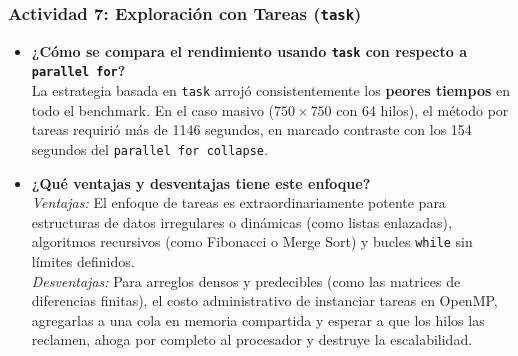 \subsubsection*{Actividad 7: Exploración con Tareas (\texttt{task})}
\begin{itemize}
    \item \textbf{¿Cómo se compara el rendimiento usando \texttt{task} con respecto a \texttt{parallel for}?} \\
    La estrategia basada en \texttt{task} arrojó consistentemente los \textbf{peores tiempos} en todo el benchmark. En el caso masivo ($750 \times 750$ con 64 hilos), el método por tareas requirió más de 1146 segundos, en marcado contraste con los 154 segundos del \texttt{parallel for collapse}.
    \item \textbf{¿Qué ventajas y desventajas tiene este enfoque?} \\
    \textit{Ventajas:} El enfoque de tareas es extraordinariamente potente para estructuras de datos irregulares o dinámicas (como listas enlazadas), algoritmos recursivos (como Fibonacci o Merge Sort) y bucles \texttt{while} sin límites definidos. \\
    \textit{Desventajas:} Para arreglos densos y predecibles (como las matrices de diferencias finitas), el costo administrativo de instanciar tareas en OpenMP, agregarlas a una cola en memoria compartida y esperar a que los hilos las reclamen, ahoga por completo al procesador y destruye la escalabilidad.
\end{itemize}




